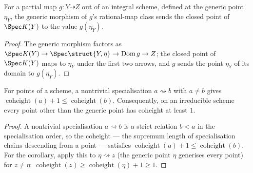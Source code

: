 \begin{lemma}
  \label{lem:generic_value_bridge}
  \leanok
  For a partial map \(g : Y \dashrightarrow Z\) out of an integral scheme,
  defined at the generic point \(\eta_Y\), the generic morphism of
  \(g\)'s rational-map class sends the closed point of \(\Spec K(Y)\) to the
  value \(g(\eta_Y)\).
\end{lemma}
\begin{proof}
  \leanok
  The generic morphism factors as \(\Spec K(Y) \to \Spec\struct{Y,\eta} \to
  \operatorname{Dom} g \to Z\); the closed point of \(\Spec K(Y)\) maps to
  \(\eta_Y\) under the first two arrows, and \(g\) sends the point \(\eta_Y\) of
  its domain to \(g(\eta_Y)\).
\end{proof}

\begin{lemma}
  \label{lem:coheight_strictness}
  \leanok
  For points of a scheme, a nontrivial specialisation \(a \rightsquigarrow b\)
  with \(a \neq b\) gives \(\operatorname{coheight}(a) + 1 \le
  \operatorname{coheight}(b)\). Consequently, on an irreducible scheme every point
  other than the generic point has coheight at least \(1\).
\end{lemma}
\begin{proof}
  \leanok
  A nontrivial specialisation \(a \rightsquigarrow b\) is a strict relation
  \(b < a\) in the specialisation order, so the coheight --- the supremum length
  of specialisation chains descending from a point --- satisfies
  \(\operatorname{coheight}(a) + 1 \le \operatorname{coheight}(b)\). For the
  corollary, apply this to \(\eta \rightsquigarrow z\) (the generic point \(\eta\)
  generises every point) for \(z \neq \eta\): \(\operatorname{coheight}(z) \ge
  \operatorname{coheight}(\eta) + 1 \ge 1\).
\end{proof}

